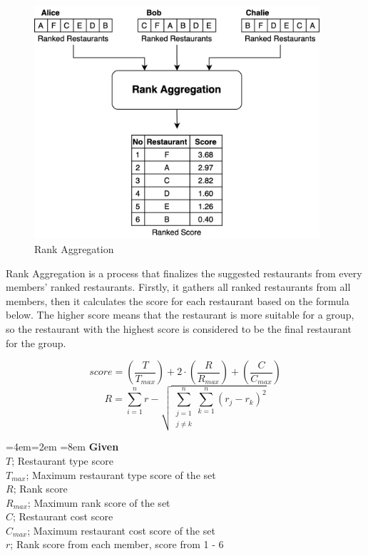 \documentclass[12pt,oneside,openright,a4paper]{cpe-english-project}
\newenvironment{blockquote}{%
  \par%
  \medskip
  \leftskip=4em\rightskip=2em%
  \noindent\ignorespaces}{%
  \par\medskip}
\begin{document}
\begin{figure}[H]\centering
\includegraphics[width=300pt]{./images/3ga_rankagg.png}
\caption{Rank Aggregation}\label{fig:3ga_rankagg}
\end{figure}

Rank Aggregation is a process that finalizes the suggested restaurants from every members’ ranked restaurants. Firstly, it gathers all ranked restaurants from all members, then it calculates the score for each restaurant based on the formula below. The higher score means that the restaurant is more suitable for a group, so the restaurant with the highest score is considered to be the final restaurant for the group.

\begin{equation}\label{eq:rankaggscore}
score = \left (\frac{T}{T_{max}}  \right ) + 2\cdot \left (\frac{R}{R_{max}}  \right ) + \left (\frac{C}{C_{max}}  \right )
\end{equation}
\begin{equation}\label{eq:rankaggscorerank}
R = \sum_{i=1}^{n}r - \sqrt{\sum_{\substack{j=1 \\ j\neq k}}^{n}\sum_{k=1}^{n}(r_j - r_k)^2}
\end{equation}

\begin{blockquote}\leftskip=8em
\textbf{Given}\\
$T$; Restaurant type score\\
$T_{max}$; Maximum restaurant type score of the set\\
$R$; Rank score\\
$R_{max}$; Maximum rank score of the set\\
$C$; Restaurant cost score\\
$C_{max}$; Maximum restaurant cost score of the set\\
$r$; Rank score from each member, score from 1 - 6
\end{blockquote}
\end{document}
